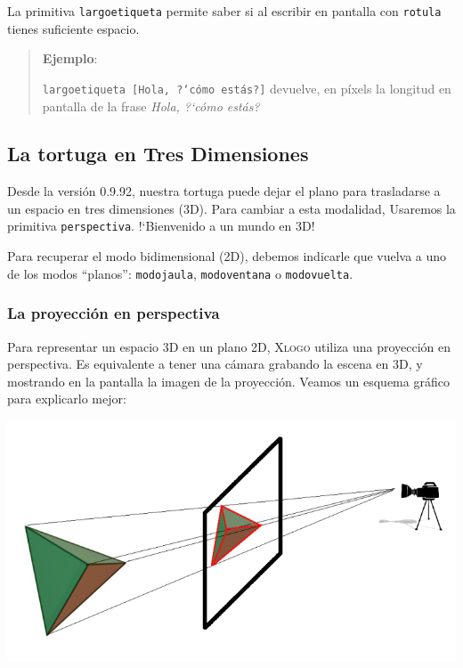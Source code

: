 La primitiva \texttt{largoetiqueta} permite saber si al escribir en
pantalla con \texttt{rotula} tienes suficiente espacio.
\begin{quote}
   \noindent \textbf{Ejemplo}:

   \texttt{largoetiqueta [Hola, ?`c\'omo est\'as?]} devuelve, en p\'ixels
   la longitud en pantalla de la frase \textit{Hola, ?`c\'omo est\'as?} 
\end{quote}

\subsection{La tortuga en Tres Dimensiones}
   \label{3-Dimensiones}
    

Desde la versi\'on 0.9.92, nuestra tortuga puede dejar el plano para trasladarse
a un espacio en tres dimensiones (3D). Para cambiar a esta modalidad,
Usaremos la primitiva \texttt{perspectiva}. !`Bienvenido a un mundo en 3D!

Para recuperar el modo bidimensional (2D), debemos indicarle que vuelva a uno
de los modos ``planos'': \texttt{modojaula}, \texttt{modoventana} o 
\texttt{modovuelta}. 

\subsubsection{La proyecci\'on en perspectiva}

Para representar un espacio 3D en un plano 2D, \textsc{Xlogo} utiliza una
proyecci\'on en perspectiva. Es equivalente a tener una c\'amara grabando
la escena en 3D, y mostrando en la pantalla la imagen de la proyecci\'on.
Veamos un esquema gr\'afico para explicarlo mejor:
\begin{center}
   \includegraphics[scale=0.5]{Imagenes/05_Primitivas/Perspectiva01.png}
\end{center}

